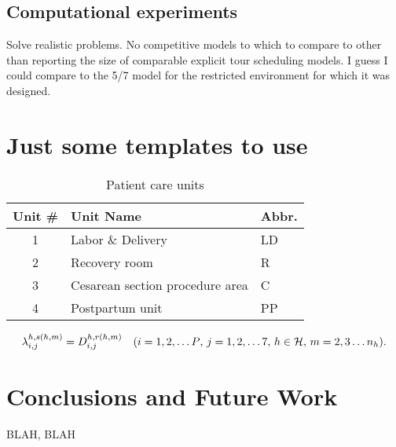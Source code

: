 \subsection{Computational experiments}
\label{sec-computational}

Solve realistic problems. No competitive models to which to compare to other than reporting the size of comparable explicit tour scheduling models. I guess I could compare to the 5/7 model for the restricted environment for which it was designed.

\section{Just some templates to use}


\begin{table}
  \centering
  \caption{Patient care units}\label{table:units}
\begin{tabular}{cll}\hline
 Unit \#       & Unit Name    & Abbr.   \\ \hline
  1       & Labor \& Delivery    & LD    \\
  2       & Recovery room   & R    \\
  3       & Cesarean section procedure area    & C    \\
  4       & Postpartum unit    & PP   \\ \hline  
\end{tabular}
\end{table}



\begin{equation}
\label{eqn:flowcons}
\lambda_{i,j}^{h,s(h,m)}=D_{i,j}^{h,r(h,m)} \quad \text{($i=1,2,\ldots P$, $j=1,2,\ldots 7$, $h \in {\cal H}$, $m=2,3\ldots n_{h}$).}
\end{equation}
\section{Conclusions and Future Work}
\label{sec-conclusions}


BLAH, BLAH








%





